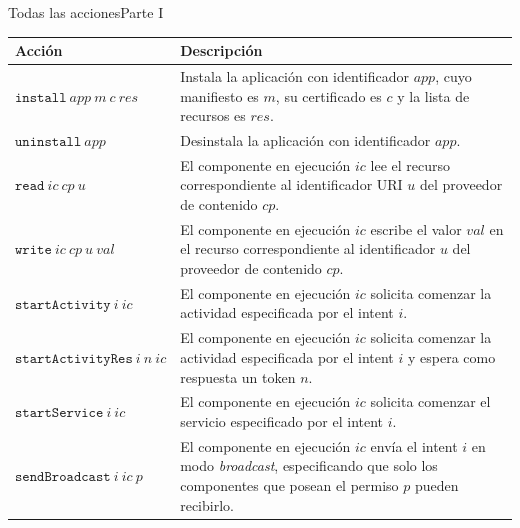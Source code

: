 \documentclass[pdf, handout]{beamer} %
\begin{document}
\begin{frame}{Todas las acciones}{Parte I}
    \fontsize{8pt}{9pt}\selectfont
    \begin{table}
        \begin{tabularx}{\linewidth}{|l X|}
            \hline
            \textbf{Acción}                    & \textbf{Descripción}                                                                                                                                               \\
            \hline
            $\mathtt{install}~app~m~c~res$     & Instala la aplicación con identificador $app$, cuyo manifiesto es $m$, su certificado es $c$ y la lista de recursos es $res$.                                      \\
            \hline
            $\mathtt{uninstall}~app$           & Desinstala la aplicación con identificador $app$.                                                                                                                  \\
            \hline
            $\mathtt{read}~ic~cp~u$            & El componente en ejecución $ic$ lee el recurso correspondiente al identificador URI $u$ del proveedor de contenido $cp$.                                           \\
            \hline
            $\mathtt{write}~ic~cp~u~val$       & El componente en ejecución $ic$ escribe el valor $val$ en el recurso correspondiente al identificador $u$ del proveedor de contenido $cp$.                         \\
            \hline
            $\mathtt{startActivity}~i~ic$      & El componente en ejecución $ic$ solicita comenzar la actividad especificada por el intent $i$.                                                                     \\
            \hline
            $\mathtt{startActivityRes}~i~n~ic$ & El componente en ejecución $ic$ solicita comenzar la actividad especificada por el intent $i$ y espera como respuesta un token $n$.                                \\
            \hline
            $\mathtt{startService}~i~ic$       & El componente en ejecución $ic$ solicita comenzar el servicio especificado por el intent $i$.                                                                      \\
            \hline
            $\mathtt{sendBroadcast}~i~ic~p$    & El componente en ejecución $ic$ envía el intent $i$ en modo \textit{broadcast}, especificando que solo los componentes que posean el permiso $p$ pueden recibirlo. \\
            \hline
        \end{tabularx}
    \end{table}
\end{frame}
\end{document}
